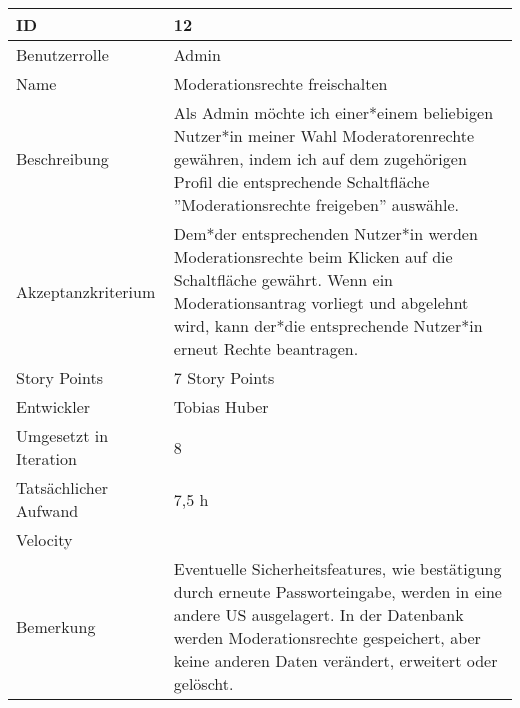 \begin{tabularx}{\textwidth}{|p{}|X|}
	\hline
	ID & 12\\
	\hline
	Benutzerrolle & Admin\\
	\hline
	Name & Moderationsrechte freischalten\\
	\hline
	Beschreibung & Als Admin möchte ich einer*einem beliebigen Nutzer*in meiner Wahl Moderatorenrechte gewähren, indem ich auf dem zugehörigen Profil die entsprechende Schaltfläche ''Moderationsrechte freigeben'' auswähle.\\
	\hline
	Akzeptanzkriterium & Dem*der entsprechenden Nutzer*in werden Moderationsrechte beim Klicken auf die Schaltfläche gewährt. Wenn ein Moderationsantrag vorliegt und abgelehnt wird, kann der*die entsprechende Nutzer*in erneut Rechte beantragen.\\
	\hline
	Story Points & 7 Story Points\\
	\hline
	Entwickler & Tobias Huber\\
	\hline
	Umgesetzt in Iteration & 8\\
	\hline
	Tatsächlicher Aufwand & 7,5 h\\
	\hline
	Velocity & \\
	\hline
	Bemerkung & Eventuelle Sicherheitsfeatures, wie bestätigung durch erneute Passworteingabe, werden in eine andere US ausgelagert. In der Datenbank werden Moderationsrechte gespeichert, aber keine anderen Daten verändert, erweitert oder gelöscht.\\
	\hline
\end{tabularx}
\vspace{20pt}
